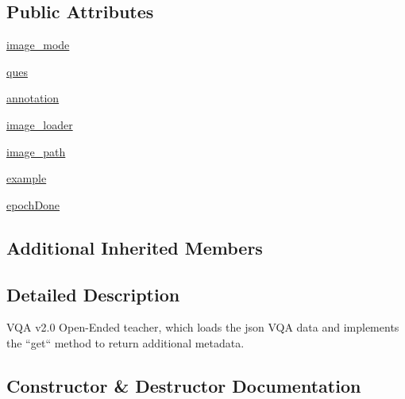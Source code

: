 \subsection*{Public Attributes}
\begin{DoxyCompactItemize}
\item 
\hyperlink{classparlai_1_1tasks_1_1vqa__v2_1_1agents_1_1OeTeacher_a8f3225181d7dd82bc4f6356a45377e77}{image\+\_\+mode}
\item 
\hyperlink{classparlai_1_1tasks_1_1vqa__v2_1_1agents_1_1OeTeacher_a97e56f91309795ad390573355585a2f3}{ques}
\item 
\hyperlink{classparlai_1_1tasks_1_1vqa__v2_1_1agents_1_1OeTeacher_ad195c1182da5744f020d6181a7b99218}{annotation}
\item 
\hyperlink{classparlai_1_1tasks_1_1vqa__v2_1_1agents_1_1OeTeacher_a432beaf6869117f7ed76cb78d876996a}{image\+\_\+loader}
\item 
\hyperlink{classparlai_1_1tasks_1_1vqa__v2_1_1agents_1_1OeTeacher_a7a1259d5b801f1e7984700a31405189f}{image\+\_\+path}
\item 
\hyperlink{classparlai_1_1tasks_1_1vqa__v2_1_1agents_1_1OeTeacher_a949cbafa55cf6c1175a90c3b54d68426}{example}
\item 
\hyperlink{classparlai_1_1tasks_1_1vqa__v2_1_1agents_1_1OeTeacher_ae8240944a80920ce505269347bea3c6b}{epoch\+Done}
\end{DoxyCompactItemize}
\subsection*{Additional Inherited Members}


\subsection{Detailed Description}
\begin{DoxyVerb}VQA v2.0 Open-Ended teacher, which loads the json VQA data and implements the
``get`` method to return additional metadata.
\end{DoxyVerb}
 

\subsection{Constructor \& Destructor Documentation}
\mbox{\label{classparlai_1_1tasks_1_1vqa__v2_1_1agents_1_1OeTeacher_ae97aade64cf9108a8cb022721a13ebd4}} 

